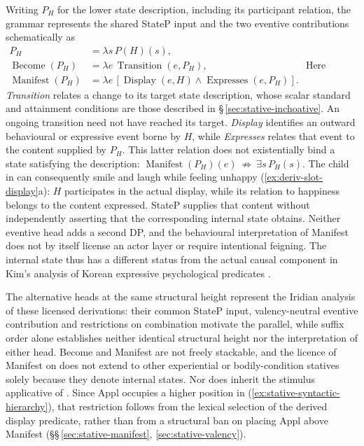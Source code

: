 Writing $P_H$ for the lower state description, including its participant
relation, the grammar represents the shared StateP input and the two
eventive contributions schematically as
\ex\label{ex:stative-eventive-composition}
$\begin{aligned}
 P_H &=\lambda s\,P(H)(s),\\
 \operatorname{Become}(P_H)
   &=\lambda e\,\operatorname{Transition}(e,P_H),\\
 \operatorname{Manifest}(P_H)
   &=\lambda e\,[\operatorname{Display}(e,H)
                 \land\operatorname{Expresses}(e,P_H)].
\end{aligned}$
\xe
\noindent Here \emph{Transition} relates a change to its target state description,
whose scalar standard and attainment conditions are those described in
§\,\ref{sec:stative-inchoative}. An ongoing transition need not have
reached its target. \emph{Display} identifies an outward behavioural or
expressive event borne by $H$, while \emph{Expresses} relates that event
to the content supplied by $P_H$. This latter relation does not
existentially bind a state satisfying the description:
\ex\label{ex:stative-manifest-nonentailment}
 $\operatorname{Manifest}(P_H)(e)
 \ \not\Rightarrow\ \exists s\,P_H(s).$
\xe
\noindent The child in  can consequently smile and laugh while
feeling unhappy (\ref{ex:deriv-slot-display}a): $H$ participates in the
actual display, while its relation to happiness belongs to the content
expressed. StateP supplies that content without independently asserting
that the corresponding internal state obtains. Neither eventive head adds
a second DP, and the behavioural interpretation of Manifest does not by
itself license an actor layer or require intentional feigning. The internal
state thus has a different status from the actual causal component in
Kim's analysis of Korean expressive psychological predicates
\cite[abstract]{kimyoonshin2026}.

The alternative heads at the same structural height represent the Iridian
analysis of these licensed derivations: their common StateP input, valency-neutral eventive
contribution and restrictions on combination motivate the parallel, while
suffix order alone establishes neither identical structural height nor the
interpretation of either head. Become and Manifest are not freely
stackable, and the licence of Manifest on  does not extend
to other experiential or bodily-condition statives solely because they
denote internal states. Nor does  inherit the stimulus
applicative of . Since Appl occupies a higher position in
(\ref{ex:stative-syntactic-hierarchy}), that restriction follows from the
lexical selection of the derived display predicate, rather than from a
structural ban on placing Appl above Manifest
(§§\,\ref{sec:stative-manifest}, \ref{sec:stative-valency}).

